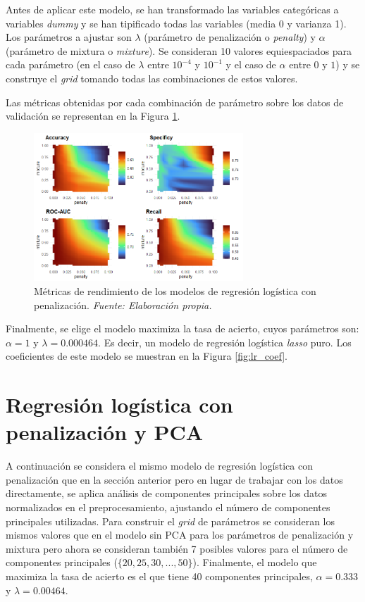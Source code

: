 \documentclass[12pt,a4paper,]{book}
\newcounter{dummy}
\numberwithin{dummy}{section}
\theoremstyle{ocrenumbox}
\theoremstyle{blacknumex}
\theoremstyle{blacknumbox}
\theoremstyle{ocrenum}
\theoremstyle{ocrenum}
\begin{document}
Antes de aplicar este modelo, se han transformado las variables
categóricas a variables \emph{dummy} y se han tipificado todas las
variables (media 0 y varianza 1). Los parámetros a ajustar son
\(\lambda\) (parámetro de penalización o \emph{penalty}) y \(\alpha\)
(parámetro de mixtura o \emph{mixture}). Se consideran 10 valores
equiespaciados para cada parámetro (en el caso de \(\lambda\) entre
\(10^{-4}\) y \(10^{-1}\) y el caso de \(\alpha\) entre \(0\) y \(1\)) y
se construye el \emph{grid} tomando todas las combinaciones de estos
valores.

Las métricas obtenidas por cada combinación de parámetro sobre los datos
de validación se representan en la Figura \ref{fig:lr_tuningplot}.

\begin{figure}[h!]
\centering
\includegraphics[width =0.7\textwidth]{graficos/lr_tuningplot.png}
\caption[Métricas de rendimiento de los modelos de regresión logística con penalización]{Métricas de rendimiento de los modelos de regresión logística con penalización.  \it Fuente: Elaboración propia.}
\label{fig:lr_tuningplot}
\end{figure}

Finalmente, se elige el modelo maximiza la tasa de acierto, cuyos
parámetros son: \(\alpha= 1\) y \(\lambda = 0.000464\). Es decir, un
modelo de regresión logística \emph{lasso} puro. Los coeficientes de
este modelo se muestran en la Figura \ref{fig:lr_coef}.

\hypertarget{regresiuxf3n-loguxedstica-con-penalizaciuxf3n-y-pca}{%
\section{Regresión logística con penalización y
PCA}\label{regresiuxf3n-loguxedstica-con-penalizaciuxf3n-y-pca}}

A continuación se considera el mismo modelo de regresión logística con
penalización que en la sección anterior pero en lugar de trabajar con
los datos directamente, se aplica análisis de componentes principales
sobre los datos normalizados en el preprocesamiento, ajustando el número
de componentes principales utilizadas. Para construir el \emph{grid} de
parámetros se consideran los mismos valores que en el modelo sin PCA
para los parámetros de penalización y mixtura pero ahora se consideran
también 7 posibles valores para el número de componentes principales
(\(\{20,25,30,...,50\}\)). Finalmente, el modelo que maximiza la tasa de
acierto es el que tiene 40 componentes principales, \(\alpha= 0.333\) y
\(\lambda = 0.00464\).
\end{document}
